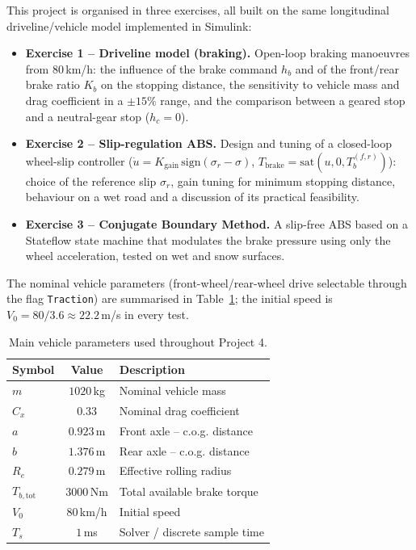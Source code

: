 This project is organised in three exercises, all built on the same
longitudinal driveline/vehicle model implemented in Simulink:
\begin{itemize}
    \item \textbf{Exercise 1 -- Driveline model (braking).} Open-loop
          braking manoeuvres from $80$\,km/h: the influence of the
          brake command $h_b$ and of the front/rear brake ratio $K_b$
          on the stopping distance, the sensitivity to vehicle mass and
          drag coefficient in a $\pm15\%$ range, and the comparison
          between a geared stop and a neutral-gear stop ($h_c=0$).
    \item \textbf{Exercise 2 -- Slip-regulation ABS.} Design and tuning
          of a closed-loop wheel-slip controller
          ($\dot u = K_\mathrm{gain}\,\mathrm{sign}(\sigma_r-\sigma)$,
          $T_\mathrm{brake}=\mathrm{sat}(u,0,T_b^{(f,r)})$): choice of
          the reference slip $\sigma_r$, gain tuning for minimum
          stopping distance, behaviour on a wet road and a discussion of
          its practical feasibility.
    \item \textbf{Exercise 3 -- Conjugate Boundary Method.} A
          slip-free ABS based on a Stateflow state machine that
          modulates the brake pressure using only the wheel
          acceleration, tested on wet and snow surfaces.
\end{itemize}

The nominal vehicle parameters (front-wheel/rear-wheel drive selectable
through the flag \texttt{Traction}) are summarised in
Table~\ref{tab:params}; the initial speed is $V_0=80/3.6\approx
22.2$\,m/s in every test.

\begin{table}[H]
    \centering
    \begin{tabular}{lcl}
        \toprule
        \textbf{Symbol} & \textbf{Value} & \textbf{Description} \\
        \midrule
        $m$        & $1020$\,kg     & Nominal vehicle mass \\
        $C_x$      & $0.33$         & Nominal drag coefficient \\
        $a$        & $0.923$\,m     & Front axle -- c.o.g. distance \\
        $b$        & $1.376$\,m     & Rear axle -- c.o.g. distance \\
        $R_e$      & $0.279$\,m     & Effective rolling radius \\
        $T_{b,\mathrm{tot}}$ & $3000$\,Nm & Total available brake torque \\
        $V_0$      & $80$\,km/h     & Initial speed \\
        $T_s$      & $1$\,ms        & Solver / discrete sample time \\
        \bottomrule
    \end{tabular}
    \caption{Main vehicle parameters used throughout Project 4.}
    \label{tab:params}
\end{table}

